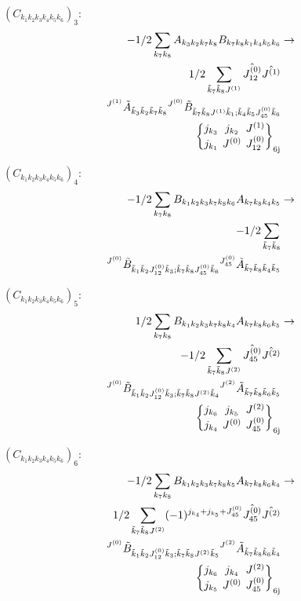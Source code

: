 \documentclass[11pt]{article}
\newcommand{\sixj}[6]{\begingroup\setlength{\arraycolsep}{0.2em}\begin{Bmatrix} #1 & #2 & #3 \\ #4 & #5 & #6 \end{Bmatrix}_{\text{6j}}\endgroup}
\begin{document}
$\left({C}_{{k}_{1}{k}_{2}{k}_{3}{k}_{4}{k}_{5}{k}_{6}}\right)_{3}$:
\begin{align}
-1/2\sum_{{k}_{7}{k}_{8}}{A}_{{k}_{3}{k}_{2}{k}_{7}{k}_{8}}{B}_{{k}_{7}{k}_{8}{k}_{1}{k}_{4}{k}_{5}{k}_{6}}&\rightarrow \notag \\1/2\sum_{\tilde{k}_{7}\tilde{k}_{8}J^{(1)}}\hat{J^{(0)}_{12}}\hat{J^{(1)}}& \notag \\{}^{J^{(1)}}\tilde{A}_{\tilde{k}_{3}\tilde{k}_{2}\tilde{k}_{7}\tilde{k}_{8}}{}^{J^{(0)}}\tilde{B}_{\tilde{k}_{7}\tilde{k}_{8}J^{(1)}\tilde{k}_{1};\tilde{k}_{4}\tilde{k}_{5}J^{(0)}_{45}\tilde{k}_{6}}& \notag \\\sixj{j_{{k}_{3}}}{j_{{k}_{2}}}{J^{(1)}}{j_{{k}_{1}}}{J^{(0)}}{J^{(0)}_{12}}
\end{align}

$\left({C}_{{k}_{1}{k}_{2}{k}_{3}{k}_{4}{k}_{5}{k}_{6}}\right)_{4}$:
\begin{align}
-1/2\sum_{{k}_{7}{k}_{8}}{B}_{{k}_{1}{k}_{2}{k}_{3}{k}_{7}{k}_{8}{k}_{6}}{A}_{{k}_{7}{k}_{8}{k}_{4}{k}_{5}}&\rightarrow \notag \\-1/2\sum_{\tilde{k}_{7}\tilde{k}_{8}}& \notag \\{}^{J^{(0)}}\tilde{B}_{\tilde{k}_{1}\tilde{k}_{2}J^{(0)}_{12}\tilde{k}_{3};\tilde{k}_{7}\tilde{k}_{8}J^{(0)}_{45}\tilde{k}_{6}}{}^{J^{(0)}_{45}}\tilde{A}_{\tilde{k}_{7}\tilde{k}_{8}\tilde{k}_{4}\tilde{k}_{5}}& \notag \\
\end{align}

$\left({C}_{{k}_{1}{k}_{2}{k}_{3}{k}_{4}{k}_{5}{k}_{6}}\right)_{5}$:
\begin{align}
1/2\sum_{{k}_{7}{k}_{8}}{B}_{{k}_{1}{k}_{2}{k}_{3}{k}_{7}{k}_{8}{k}_{4}}{A}_{{k}_{7}{k}_{8}{k}_{6}{k}_{5}}&\rightarrow \notag \\-1/2\sum_{\tilde{k}_{7}\tilde{k}_{8}J^{(2)}}\hat{J^{(0)}_{45}}\hat{J^{(2)}}& \notag \\{}^{J^{(0)}}\tilde{B}_{\tilde{k}_{1}\tilde{k}_{2}J^{(0)}_{12}\tilde{k}_{3};\tilde{k}_{7}\tilde{k}_{8}J^{(2)}\tilde{k}_{4}}{}^{J^{(2)}}\tilde{A}_{\tilde{k}_{7}\tilde{k}_{8}\tilde{k}_{6}\tilde{k}_{5}}& \notag \\\sixj{j_{{k}_{6}}}{j_{{k}_{5}}}{J^{(2)}}{j_{{k}_{4}}}{J^{(0)}}{J^{(0)}_{45}}
\end{align}

$\left({C}_{{k}_{1}{k}_{2}{k}_{3}{k}_{4}{k}_{5}{k}_{6}}\right)_{6}$:
\begin{align}
-1/2\sum_{{k}_{7}{k}_{8}}{B}_{{k}_{1}{k}_{2}{k}_{3}{k}_{7}{k}_{8}{k}_{5}}{A}_{{k}_{7}{k}_{8}{k}_{6}{k}_{4}}&\rightarrow \notag \\1/2\sum_{\tilde{k}_{7}\tilde{k}_{8}J^{(2)}}(-1)^{j_{{k}_{4}} +j_{{k}_{5}} +J^{(0)}_{45} }\hat{J^{(0)}_{45}}\hat{J^{(2)}}& \notag \\{}^{J^{(0)}}\tilde{B}_{\tilde{k}_{1}\tilde{k}_{2}J^{(0)}_{12}\tilde{k}_{3};\tilde{k}_{7}\tilde{k}_{8}J^{(2)}\tilde{k}_{5}}{}^{J^{(2)}}\tilde{A}_{\tilde{k}_{7}\tilde{k}_{8}\tilde{k}_{6}\tilde{k}_{4}}& \notag \\\sixj{j_{{k}_{6}}}{j_{{k}_{4}}}{J^{(2)}}{j_{{k}_{5}}}{J^{(0)}}{J^{(0)}_{45}}
\end{align}
\end{document}
